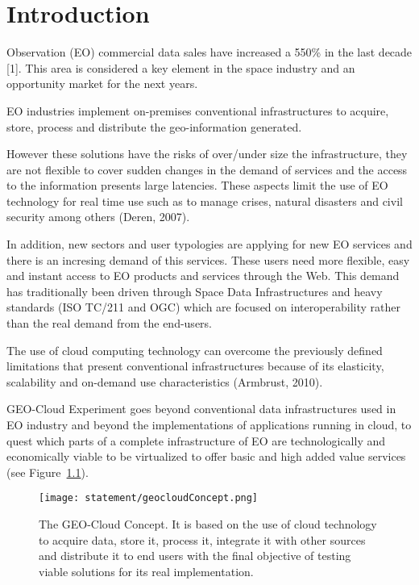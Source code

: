 \chapter{Introduction}

 Observation (EO) commercial data sales have increased a 550\% in
the last decade \cite{sousa}[1]. This area is considered a key element in the
space industry and an opportunity market for the next years. 

EO industries implement on-premises conventional infrastructures to acquire,
store, process and distribute the geo-information generated. 

However these solutions have the risks of over/under size the infrastructure, they are not flexible to cover sudden changes in the demand of services and the access to the information presents large latencies.  These aspects limit the use of EO technology for real time use such as to manage crises, natural disasters and civil security among others (Deren, 2007).

In addition, new sectors and user typologies are applying for new EO services
and there is an incresing demand of this services. These users
need more flexible, easy and instant access to EO products and services through
the Web. This demand has traditionally been driven through Space Data
Infrastructures and heavy standards (ISO TC/211 and OGC) which are focused on
interoperability rather than the real demand from the end-users. 

The use of cloud computing technology can overcome the previously defined limitations that present conventional infrastructures because of its elasticity, scalability and on-demand use characteristics (Armbrust, 2010). 

GEO-Cloud Experiment goes beyond conventional data infrastructures used in EO
industry and beyond the implementations of applications running in cloud, to
quest which parts of a complete infrastructure of EO are technologically and
economically viable to be virtualized to offer basic and high added value
services (see Figure~\ref{fig:intr-geocloudConcept}).

\begin{figure}[!h]
\begin{center}
\texttt{[image: statement/geocloudConcept.png]}
\caption{The GEO-Cloud Concept. It is based on the use of cloud technology to acquire data, store it, process it, integrate it with other sources and distribute it to end users with the final objective of testing viable solutions for its real implementation.}
\label{fig:intr-geocloudConcept}
\end{center}
\end{figure}
 

